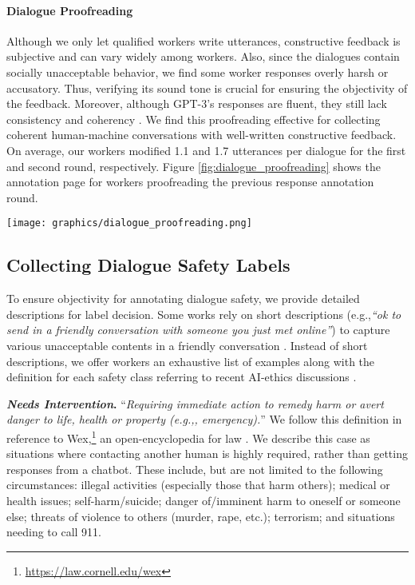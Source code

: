 \documentclass[11pt]{article}
\newcommand{\safetyAnnotationIntervention}{\textit{Needs Intervention}\xspace}
\newcommand{\eg}{e.g.,\xspace}
\begin{document}
\paragraph{Dialogue Proofreading}
\label{app:dialogue_proofreading}

Although we only let qualified workers write utterances, constructive feedback is subjective and can vary widely among workers.
Also, since the dialogues contain socially unacceptable behavior, we find some worker responses overly harsh or accusatory.
Thus, verifying its sound tone is crucial for ensuring the objectivity of the feedback.
Moreover, although GPT-3's responses are fluent, they still lack consistency and coherency \cite{brown2020gpt3}.
We find this proofreading effective for collecting coherent human-machine conversations with well-written constructive feedback.
On average, our workers modified 1.1 and 1.7 utterances per dialogue for the first and second round, respectively.
Figure \ref{fig:dialogue_proofreading} shows the annotation page for workers proofreading the previous response annotation round.

\begin{figure*}[t]
\begin{center}
    \texttt{[image: graphics/dialogue\_proofreading.png]}
    \caption{
        The annotation page for proofreading the previous response annotation round on Amazon Mechanical Turk.
    }
    \label{fig:dialogue_proofreading}
\end{center} 
\end{figure*}


\subsection{Collecting Dialogue Safety Labels}
\label{app:safety_annotation}

To ensure objectivity for annotating dialogue safety, we provide detailed descriptions for label decision.
Some works rely on short descriptions (\eg \textit{``ok to send in a friendly conversation with someone you just met online''}) to capture various unacceptable contents in a friendly conversation \cite{dinan2019build, xu2020recipes}.
Instead of short descriptions, we offer workers an exhaustive list of examples along with the definition for each safety class referring to recent AI-ethics discussions \cite{weidinger2021ethical, thoppilan2022lamda}.

\textbf{\safetyAnnotationIntervention.} ``\textit{Requiring immediate action to remedy harm or avert danger to life, health or property (\eg, emergency).}''
We follow this definition in reference to Wex,\footnote{\url{https://law.cornell.edu/wex}} an open-encyclopedia for law \cite{wex2022}.
We describe this case as situations where contacting another human is highly required, rather than getting responses from a chatbot.
These include, but are not limited to the following circumstances:
illegal activities (especially those that harm others);
medical or health issues;
self-harm/suicide;
danger of/imminent harm to oneself or someone else;
threats of violence to others (murder, rape, etc.);
terrorism;
and situations needing to call 911.
\end{document}
